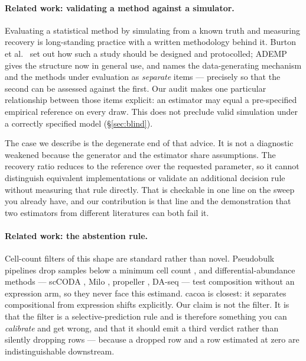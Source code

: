 \paragraph{Related work: validating a method against a simulator.} Evaluating a
statistical method by simulating from a known truth and measuring recovery is
long-standing practice with a written methodology behind it. Burton et
al.~\citep{burton2006} set out how such a study should be designed and
protocolled; ADEMP \citep{morris2019} gives the structure now in general use,
and names the data-generating mechanism and the methods under evaluation as
\emph{separate} items --- precisely so that the second can be assessed against
the first. Our audit makes one particular relationship between those items explicit: an
estimator may equal a pre-specified empirical reference on every draw.
This does not preclude valid simulation under a correctly specified model
(\S\ref{sec:blind}).

The case we describe is the degenerate end of that advice. It is not a
diagnostic weakened because the generator and the estimator share assumptions.
The recovery ratio reduces to the reference over the requested parameter, so
it cannot distinguish equivalent implementations or validate an additional
decision rule without measuring that rule directly. That is
checkable in one line on the sweep you already have, and our contribution is
that line and the demonstration that two estimators from different literatures
can both fail it.

\paragraph{Related work: the abstention rule.} Cell-count filters of this shape are standard rather
than novel. Pseudobulk pipelines drop samples below a minimum cell count
\citep{crowell2020}, and differential-abundance methods --- scCODA
\citep{buettner2021}, Milo \citep{dann2022}, propeller \citep{phipson2022},
DA-seq \citep{zhao2021} --- test composition without an expression arm, so they
never face this estimand. cacoa \citep{petukhov2022} is closest: it separates
compositional from expression shifts explicitly. Our claim is not the filter. It
is that the filter is a selective-prediction rule \citep{chow1970,elyaniv2010,
geifman2017} and is therefore something you can \emph{calibrate} and get wrong,
and that it should emit a third verdict rather than silently dropping rows ---
because a dropped row and a row estimated at zero are indistinguishable
downstream.
